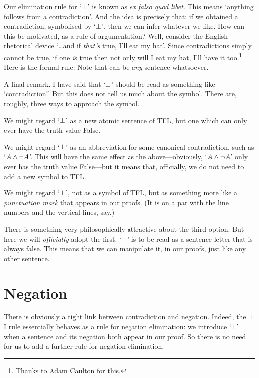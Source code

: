 Our elimination rule for `$\bot$' is known as \emph{ex falso quod libet}. This means `anything follows from a contradiction'. And the idea is precisely that: if we obtained a contradiction, symbolised by `$\bot$', then we can infer whatever we like. How can this be motivated, as a rule of argumentation? Well, consider the English rhetorical device `\ldots and if \emph{that's} true, I'll eat my hat'. Since contradictions simply cannot be true, if one \emph{i}s true then not only will I eat my hat, I'll have it too.\footnote{Thanks to Adam Caulton for this.} Here is the formal rule:
Note that  can be \emph{any} sentence whatsoever. 

A final remark. I have said that `$\bot$' should be read as something like `contradiction!' But this does not tell us much about the symbol. There are, roughly, three ways to approach the symbol. 
	\begin{ebullet}
		\item We might regard `$\bot$' as a new atomic sentence of TFL, but one which can only ever have the truth value False. 
		\item We might regard `$\bot$' as an abbreviation for some canonical contradiction, such as `$A \wedge \neg A$'. This will have the same effect as the above---obviously, `$A \wedge \neg A$' only ever has the truth value False---but it means that, officially, we do not need to add a new symbol to TFL.
		\item We might regard `$\bot$', not as a symbol of TFL, but as something more like a \emph{punctuation mark} that appears in our proofs. (It is on a par with the line numbers and the vertical lines, say.)
	\end{ebullet}
There is something very philosophically attractive about the third option. But here we will \emph{officially} adopt the first. `$\bot$' is to be read as a sentence letter that is always false. This means that we can manipulate it, in our proofs, just like any other sentence.


\section{Negation}
There is obviously a tight link between contradiction and negation. Indeed, the $\bot$I rule essentially behaves as a rule for negation elimination: we introduce `$\bot$' when a sentence and its negation both appear in our proof. So there is no need for us to add a further rule for negation elimination. 

